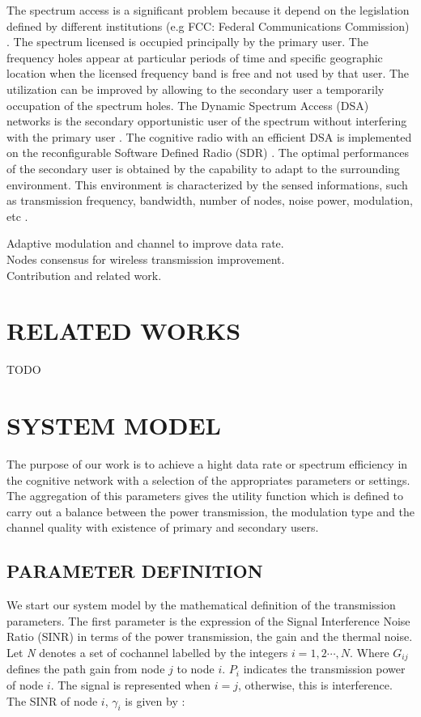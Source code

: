 \documentclass[conference]{IEEEtran}
\begin{document}
The spectrum access is a significant problem because it depend on the legislation defined by different institutions (e.g FCC: Federal Communications Commission) \cite{Haykin2005}. The spectrum licensed is occupied principally by the primary user. The frequency holes appear at particular periods of time and specific geographic location when the licensed frequency band is free and not used by that user. The utilization can be improved by allowing to the secondary user a temporarily occupation of the spectrum holes. The Dynamic Spectrum Access (DSA) networks is the secondary opportunistic user of the spectrum without interfering with the primary user \cite{Liu2011}. The cognitive radio with an efficient DSA is implemented on the reconfigurable Software Defined Radio (SDR) \cite{Mitola1993}. The optimal performances of the secondary user is obtained by the capability to adapt to the surrounding environment. This environment is characterized by the sensed informations, such as transmission frequency, bandwidth, number of nodes, noise power, modulation, etc \cite{Liu2011}. 



Adaptive modulation and channel to improve data rate. \\

Nodes consensus for wireless transmission improvement.\\

Contribution and related work. \\

\section{RELATED WORKS}


TODO

\section{SYSTEM MODEL}
The purpose of our work is to achieve a hight data rate or spectrum efficiency in the cognitive network with a selection of the appropriates parameters or settings. The aggregation of this parameters gives the utility function which is defined to carry out a balance between the power transmission, the modulation type and the channel quality with existence of primary and secondary users.

\subsection{PARAMETER DEFINITION}
We start our system model by the mathematical definition of the transmission parameters. The first parameter is the expression of the Signal Interference Noise Ratio (SINR) in terms of the power transmission, the gain and the thermal noise. Let \textit{N} denotes a set of cochannel labelled  by the integers $i=1,2 \cdots,N$. Where $G_{ij}$ defines the path gain from node $j$ to node $i$. $P_{i}$ indicates the transmission power of node $i$. The signal is represented when $i=j$, otherwise, this is interference. The SINR of node $i$, $\gamma_{i}$ is given by :
 
\end{document}
